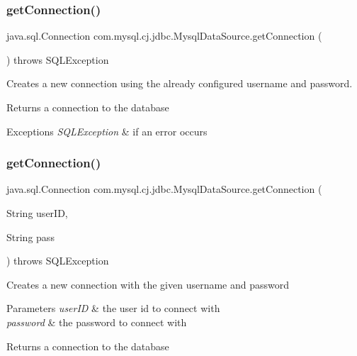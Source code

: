 \subsubsection{\texorpdfstring{get\+Connection()}{getConnection()}\hspace{0.1cm}{\footnotesize\ttfamily [1/3]}}
{\footnotesize\ttfamily java.\+sql.\+Connection com.\+mysql.\+cj.\+jdbc.\+Mysql\+Data\+Source.\+get\+Connection (\begin{DoxyParamCaption}{ }\end{DoxyParamCaption}) throws S\+Q\+L\+Exception}

Creates a new connection using the already configured username and password.

\begin{DoxyReturn}{Returns}
a connection to the database
\end{DoxyReturn}

\begin{DoxyExceptions}{Exceptions}
{\em S\+Q\+L\+Exception} & if an error occurs \\
\hline
\end{DoxyExceptions}
\mbox{\label{classcom_1_1mysql_1_1cj_1_1jdbc_1_1_mysql_data_source_ae210ba178fafb65d2f2b57ff6697ae60}} 
\subsubsection{\texorpdfstring{get\+Connection()}{getConnection()}\hspace{0.1cm}{\footnotesize\ttfamily [2/3]}}
{\footnotesize\ttfamily java.\+sql.\+Connection com.\+mysql.\+cj.\+jdbc.\+Mysql\+Data\+Source.\+get\+Connection (\begin{DoxyParamCaption}\item[{String}]{user\+ID,  }\item[{String}]{pass }\end{DoxyParamCaption}) throws S\+Q\+L\+Exception}

Creates a new connection with the given username and password


\begin{DoxyParams}{Parameters}
{\em user\+ID} & the user id to connect with \\
\hline
{\em password} & the password to connect with\\
\hline
\end{DoxyParams}
\begin{DoxyReturn}{Returns}
a connection to the database
\end{DoxyReturn}

